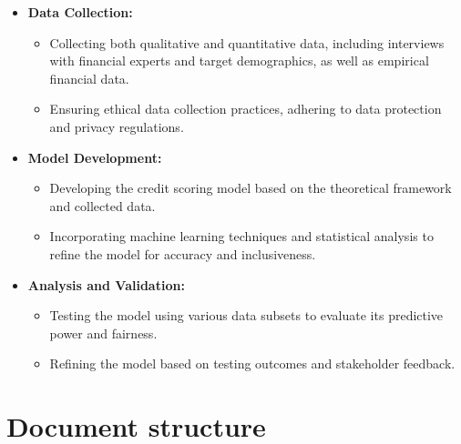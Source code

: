 \documentclass[a4paper,11pt,fleqn]{report}
\begin{document}
\begin{itemize}
    \item \textbf{Data Collection:}
    \begin{itemize}
        \item Collecting both qualitative and quantitative data, including interviews with financial experts and target demographics, as well as empirical financial data.
        \item Ensuring ethical data collection practices, adhering to data protection and privacy regulations.
    \end{itemize}
    
    \item \textbf{Model Development:}
    \begin{itemize}
        \item Developing the credit scoring model based on the theoretical framework and collected data.
        \item Incorporating machine learning techniques and statistical analysis to refine the model for accuracy and inclusiveness.
    \end{itemize}

    \item \textbf{Analysis and Validation:}
    \begin{itemize}
        \item Testing the model using various data subsets to evaluate its predictive power and fairness.
        \item Refining the model based on testing outcomes and stakeholder feedback.
    \end{itemize}
\end{itemize}


\section{Document structure}
\end{document}
